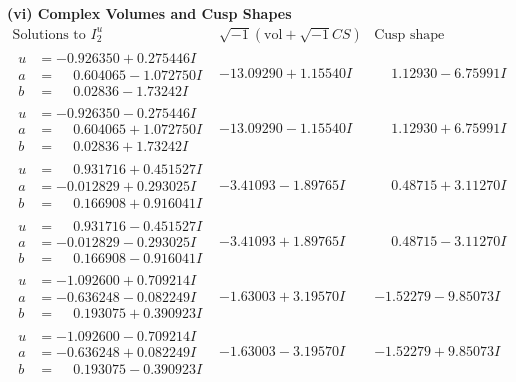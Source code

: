 \documentclass[1p]{elsarticle_modified}
\theoremstyle{definition}
\newcommand{\I}{\sqrt{-1}}
\begin{document}
\newpage\flushleft \textbf{(vi) Complex Volumes and Cusp Shapes}
$$\begin{array}{c|c|c}  
\text{Solutions to }I^u_{2}& \I (\text{vol} + \sqrt{-1}CS) & \text{Cusp shape}\\
 \hline 
\begin{aligned}
u &= -0.926350 + 0.275446 I \\
a &= \phantom{-}0.604065 - 1.072750 I \\
b &= \phantom{-}0.02836 - 1.73242 I\end{aligned}
 & -13.09290 + 1.15540 I & \phantom{-}1.12930 - 6.75991 I \\ \hline\begin{aligned}
u &= -0.926350 - 0.275446 I \\
a &= \phantom{-}0.604065 + 1.072750 I \\
b &= \phantom{-}0.02836 + 1.73242 I\end{aligned}
 & -13.09290 - 1.15540 I & \phantom{-}1.12930 + 6.75991 I \\ \hline\begin{aligned}
u &= \phantom{-}0.931716 + 0.451527 I \\
a &= -0.012829 + 0.293025 I \\
b &= \phantom{-}0.166908 + 0.916041 I\end{aligned}
 & -3.41093 - 1.89765 I & \phantom{-}0.48715 + 3.11270 I \\ \hline\begin{aligned}
u &= \phantom{-}0.931716 - 0.451527 I \\
a &= -0.012829 - 0.293025 I \\
b &= \phantom{-}0.166908 - 0.916041 I\end{aligned}
 & -3.41093 + 1.89765 I & \phantom{-}0.48715 - 3.11270 I \\ \hline\begin{aligned}
u &= -1.092600 + 0.709214 I \\
a &= -0.636248 - 0.082249 I \\
b &= \phantom{-}0.193075 + 0.390923 I\end{aligned}
 & -1.63003 + 3.19570 I & -1.52279 - 9.85073 I \\ \hline\begin{aligned}
u &= -1.092600 - 0.709214 I \\
a &= -0.636248 + 0.082249 I \\
b &= \phantom{-}0.193075 - 0.390923 I\end{aligned}
 & -1.63003 - 3.19570 I & -1.52279 + 9.85073 I \\ \hline\begin{aligned}

\end{aligned}
\end{array}$$
\end{document}
